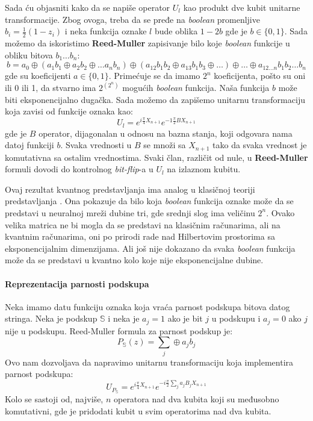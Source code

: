 \documentclass[12pt, letterpaper, oneside]{article}
\begin{document}
Sada ću objasniti kako da se napiše operator $U_l$ kao produkt dve kubit unitarne transformacije. Zbog ovoga, treba da se pređe na \textit{boolean} promenljive $b_i=\frac{1}{2}(1-z_i)$ i 
neka funkcija oznake $l$ bude oblika $1-2b$ gde je $b \in \{0,1\}$. Sada možemo da iskoristimo \textbf{Reed-Muller} zapisivanje bilo koje \textit{boolean} funkcije u obliku bitova $b_1 \dots b_n$:
\[
    b = a_0 \oplus (a_1b_1 \oplus a_2b_2 \oplus \dots a_n b_n) \oplus (a_{12}b_1b_2 \oplus a_{13}b_1b_3 \oplus \dots) \oplus \dots \oplus a_{12 \dots n}b_1b_2 \dots b_n
\]
gde su koeficijenti $a \in \{0,1\}$. Primećuje se da imamo $2^n$ koeficijenta, pošto su oni ili 0 ili 1, da stvarno ima $2^{(2^n)}$ mogućih \textit{boolean} funkcija.
Naša funkcija $b$ može biti eksponencijalno dugačka. Sada možemo da zapišemo unitarnu transformaciju koja zavisi od funkcije oznaka kao:
\[
    U_l = e^{i\frac{\pi}{4}X_{n+1}}e^{-1\frac{\pi}{2}BX_{n+1}}
\]
gde je $B$ operator, dijagonalan u odnosu na bazna stanja, koji odgovara nama datoj funkciji $b$. 
Svaka vrednosti u $B$ se množi sa $X_{n+1}$ tako da svaka vrednost je komutativna sa ostalim vrednostima. 
Svaki član, različit od nule, u \textbf{Reed-Muller} formuli dovodi do kontrolnog \textit{bit-flip}-a u $U_l$ na izlaznom kubitu.

Ovaj rezultat kvantnog predstavljanja ima analog u klasičnoj teoriji predstavljanja \cite{Cybenko1989ApproximationBS}.
Ona pokazuje da bilo koja \textit{boolean} funkcija oznake može da se predstavi u neuralnoj mreži dubine tri, gde srednji slog ima veličinu $2^n$.
Ovako velika matrica ne bi mogla da se predstavi na klasičnim računarima, ali na kvantnim računarima, oni po prirodi rade
nad Hilbertovim prostorima sa eksponencijalnim dimenzijama. Ali još nije dokazano da svaka \textit{boolean} funkcija može da se predstavi u kvantno kolo koje nije eksponencijalne dubine.

\paragraph*{Reprezentacija parnosti podskupa}
Neka imamo datu funkciju oznaka koja vraća parnost podskupa bitova datog stringa. Neka je podskup $\mathbb{S}$
i neka je $a_j=1$ ako je bit $j$ u podskupu i $a_j=0$ ako $j$ nije u podskupu. Reed-Muller formula za parnost podskup je:
\[
    P_{\mathbb{S}}(z) = \sum_j \oplus a_j b_j
\]
Ovo nam dozvoljava da napravimo unitarnu transformaciju koja implementira parnost podskupa:
\[
    U_{P_{\mathbb{S}}} = e^{i\frac{\pi}{4}X_{n+1}}e^{-i\frac{\pi}{2}\sum_j a_jB_jX_{n+1}}
\]
Kolo se sastoji od, najviše, $n$ operatora nad dva kubita koji su međusobno komutativni, gde je pridodati kubit u svim operatorima nad dva kubita.
\end{document}
